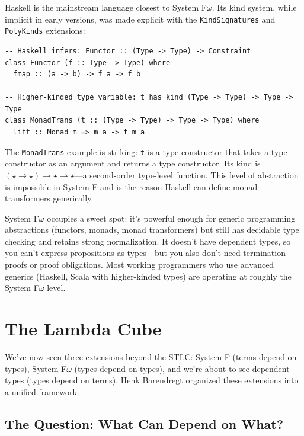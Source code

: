 \documentclass[11pt,a4paper]{article}
\theoremstyle{definition}
\begin{document}
Haskell is the mainstream language closest to System F$\omega$. Its kind
system, while implicit in early versions, was made explicit with the
\texttt{KindSignatures} and \texttt{PolyKinds} extensions:

\begin{verbatim}
-- Haskell infers: Functor :: (Type -> Type) -> Constraint
class Functor (f :: Type -> Type) where
  fmap :: (a -> b) -> f a -> f b

-- Higher-kinded type variable: t has kind (Type -> Type) -> Type -> Type
class MonadTrans (t :: (Type -> Type) -> Type -> Type) where
  lift :: Monad m => m a -> t m a
\end{verbatim}

The \texttt{MonadTrans} example is striking: \texttt{t} is a type constructor
that takes a type constructor as an argument and returns a type constructor.
Its kind is $(\star \to \star) \to \star \to \star$---a second-order type-level
function. This level of abstraction is impossible in System F and is the reason
Haskell can define monad transformers generically.

\begin{intuition}
System F$\omega$ occupies a sweet spot: it's powerful enough for generic
programming abstractions (functors, monads, monad transformers) but still
has decidable type checking and retains strong normalization. It doesn't
have dependent types, so you can't express propositions as types---but you
also don't need termination proofs or proof obligations. Most working
programmers who use advanced generics (Haskell, Scala with higher-kinded
types) are operating at roughly the System F$\omega$ level.
\end{intuition}


\section{The Lambda Cube}\label{sec:cube-sec}

We've now seen three extensions beyond the STLC: System F (terms depend on
types), System F$\omega$ (types depend on types), and we're about to see
dependent types (types depend on terms). Henk Barendregt organized these
extensions into a unified framework.


\subsection{The Question: What Can Depend on What?}
\end{document}
